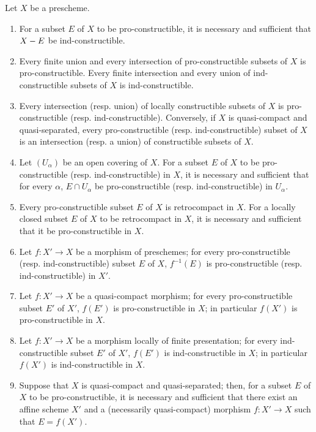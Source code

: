 \begin{proposition}[1.9.5]
\label{IV.1.9.5}
Let $X$ be a prescheme.
\begin{enumerate}
  \item[\textup{(i)}] For a subset $E$ of $X$ to be pro-constructible, it is necessary
  and sufficient that $X- E$ be ind-constructible.
  \item[\textup{(ii)}] Every finite union and every intersection of
  pro-constructible subsets of $X$ is pro-constructible. Every finite
  intersection and every union of ind-constructible subsets of $X$ is
  ind-constructible.
  \item[\textup{(iii)}] Every intersection \textup{(resp.} union\textup{)} of locally constructible
  subsets of $X$ is pro-constructible \textup{(resp.} ind-constructible\textup{)}.
  Conversely, if $X$ is quasi-compact and quasi-separated, every
  pro-constructible \textup{(resp.} ind-constructible\textup{)} subset of $X$ is an
  intersection \textup{(resp.} a union\textup{)} of constructible subsets of $X$.
  \item[\textup{(iv)}] Let $(U_\alpha)$ be an open covering of $X$. For a subset $E$
  of $X$ to be pro-constructible \textup{(resp.} ind-constructible\textup{)} in $X$, it is
  necessary and sufficient that for every $\alpha$, $E\cap U_\alpha$ be
  pro-constructible \textup{(resp.} ind-constructible\textup{)} in $U_\alpha$.
  \item[\textup{(v)}] Every pro-constructible subset $E$ of $X$ is retrocompact
  in $X$. For a locally closed subset $E$ of $X$ to be retrocompact in $X$,
  it is necessary and sufficient that it be pro-constructible in $X$.
  \item[\textup{(vi)}] Let $f:X'\to X$ be a morphism of preschemes; for every
  pro-constructible \textup{(resp.} ind-constructible\textup{)} subset $E$ of $X$, $f^{-1}(E)$
  is pro-constructible \textup{(resp.} ind-constructible\textup{)} in $X'$.
  \item[\textup{(vii)}] Let $f:X'\to X$ be a quasi-compact morphism; for every
  pro-constructible subset $E'$ of $X'$, $f(E')$ is pro-constructible in
  $X$; in particular $f(X')$ is pro-constructible in $X$.
  \item[\textup{(viii)}] Let $f:X'\to X$ be a morphism locally of finite
  presentation; for every ind-constructible subset $E'$ of $X'$, $f(E')$ is
  ind-constructible in $X$; in particular $f(X')$ is ind-constructible
  in $X$.
  \item[\textup{(ix)}] Suppose that $X$ is quasi-compact and quasi-separated; then,
  for a subset $E$ of $X$ to be pro-constructible, it is necessary and
  sufficient that there exist an affine scheme $X'$ and a (necessarily
  quasi-compact) morphism $f:X'\to X$ such that $E=f(X')$.
\end{enumerate}
\end{proposition}

